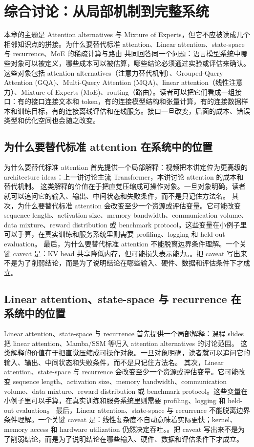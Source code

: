 \documentclass[a4paper]{article}
\begin{document}
\section{综合讨论：从局部机制到完整系统}
本章的主题是 Attention alternatives 与 Mixture of Experts，但它不应被读成几个相邻知识点的拼接。为什么要替代标准 attention、Linear attention、state-space 与 recurrence、MoE 的稀疏计算与路由 共同回答同一个问题：语言模型系统中哪些对象可以被定义，哪些成本可以被估算，哪些结论必须通过实验或评估来确认。
这些对象包括 attention alternatives（注意力替代机制）、Grouped-Query Attention (GQA)、Multi-Query Attention (MQA)、linear attention（线性注意力）、Mixture of Experts (MoE)、routing（路由）。读者可以把它们看成一组接口：有的接口连接文本和 token，有的连接模型结构和张量计算，有的连接数据样本和训练目标，有的连接离线评估和在线服务。接口一旦改变，后面的成本、错误类型和优化空间也会随之改变。
\subsection{为什么要替代标准 attention 在系统中的位置}
为什么要替代标准 attention 首先提供一个局部解释：视频把本讲定位为更高级的 architecture ideas：上一讲讨论主流 Transformer，本讲讨论 attention 的成本和替代机制。 这类解释的价值在于把直觉压缩成可操作对象。一旦对象明确，读者就可以追问它的输入、输出、中间状态和失败条件，而不是只记住方法名。
其次，为什么要替代标准 attention 会改变至少一个资源或评估变量。它可能改变 sequence length、activation size、memory bandwidth、communication volume、data mixture、reward distribution 或 benchmark protocol。这些变量在小例子里可以手算，在真实训练和服务系统里则需要 profiling、logging 和 held-out evaluation。
最后，为什么要替代标准 attention 不能脱离边界条件理解。一个关键 caveat 是：KV head 共享降低内存，但可能损失表示能力。。把 caveat 写出来不是为了削弱结论，而是为了说明结论在哪些输入、硬件、数据和评估条件下才成立。
\subsection{Linear attention、state-space 与 recurrence 在系统中的位置}
Linear attention、state-space 与 recurrence 首先提供一个局部解释：课程 slides 把 linear attention、Mamba/SSM 等归入 attention alternatives 的讨论范围。 这类解释的价值在于把直觉压缩成可操作对象。一旦对象明确，读者就可以追问它的输入、输出、中间状态和失败条件，而不是只记住方法名。
其次，Linear attention、state-space 与 recurrence 会改变至少一个资源或评估变量。它可能改变 sequence length、activation size、memory bandwidth、communication volume、data mixture、reward distribution 或 benchmark protocol。这些变量在小例子里可以手算，在真实训练和服务系统里则需要 profiling、logging 和 held-out evaluation。
最后，Linear attention、state-space 与 recurrence 不能脱离边界条件理解。一个关键 caveat 是：线性复杂度不自动意味着实际更快；kernel、memory access 和 hardware utilization 仍然决定吞吐。。把 caveat 写出来不是为了削弱结论，而是为了说明结论在哪些输入、硬件、数据和评估条件下才成立。
\end{document}
